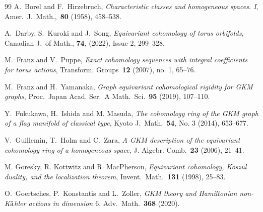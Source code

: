 \documentclass[12pt]{amsart}
\theoremstyle{definition}
\theoremstyle{remark}
\numberwithin{equation}{section}
\begin{document}
\begin{thebibliography}{99}
A.~Borel and F.~Hirzebruch,
\emph{Characteristic classes and homogeneous spaces. I},
Amer.~J.~Math.,~\textbf{80} (1958), 458--538.





A.~Darby, S.~Kuroki and J.~Song,
\emph{Equivariant cohomology of torus orbifolds},
Canadian J.~of Math., \textbf{74}, (2022), Issue 2, 299--328.

M.~Franz and V.~Puppe,
\emph{Exact cohomology sequences with integral coefficients for torus actions}, Transform. Groups~\textbf{12} (2007), no. 1, 65--76.

M.~Franz and H.~Yamanaka,
\emph{Graph equivariant cohomological rigidity for GKM graphs},
Proc.~Japan Acad. Ser.~A Math.~Sci.~\textbf{95} (2019), 107--110.

Y.~Fukukawa, H.~Ishida and M. Masuda,
\emph{The cohomology ring of the GKM graph of a flag manifold
of classical type}, Kyoto J.~Math.~\textbf{54}, No. 3 (2014), 653--677.

 V.~Guillemin, T.~Holm and C.~Zara,
\emph{A GKM description of the equivariant cohomology ring of a homogeneous space},
J. Algebr. Comb.~\textbf{23} (2006), 21--41.

 M. Goresky, R. Kottwitz and R. MacPherson,
\emph{Equivariant cohomology, Koszul duality, and the localization theorem},
Invent.~Math.~\textbf{131} (1998), 25--83.

O.~Goertsches, P.~Konstantis and L.~Zoller,
\emph{GKM theory and Hamiltonian non-K${\rm\ddot{a}}$hler actions in
dimension $6$},
Adv.~Math.~\textbf{368} (2020).


\end{thebibliography}
\end{document}
